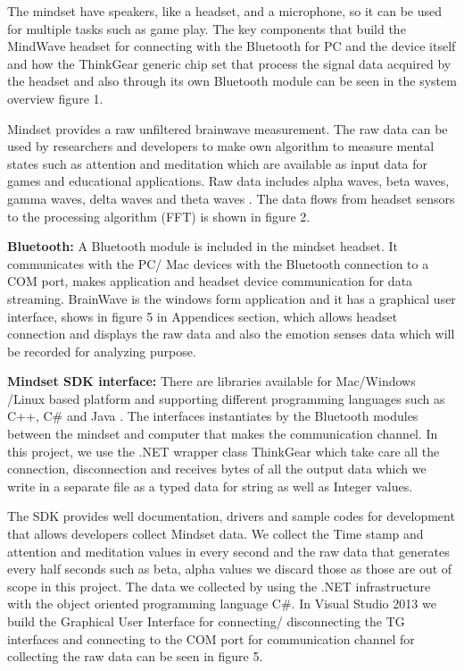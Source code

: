 \documentclass{bioinfo}
\begin{document}
The mindset have speakers, like a headset, and a microphone, so it can be used for multiple tasks such as game play. The key components that build the MindWave headset for connecting with the Bluetooth for PC and the device itself and how the ThinkGear generic chip set that process the signal data acquired by the headset and also through its own Bluetooth module can be seen in the system overview figure 1.

Mindset provides a raw unfiltered brainwave measurement. The raw data can be used by researchers and developers to make own algorithm to measure mental states such as attention and meditation which are available as input data for games and educational applications. Raw data includes alpha waves, beta waves, gamma waves, delta waves and theta waves \citep{larsen}. The data flows from headset sensors to the processing algorithm (FFT) is shown in figure 2.


\textbf{Bluetooth:} A Bluetooth module is included in the mindset headset. It communicates with the PC/ Mac devices with the Bluetooth connection to a COM port, makes application and headset device communication for data streaming. BrainWave is the windows form application and it has a graphical user interface, shows in figure 5 in Appendices section, which allows headset connection and displays the raw data and also the emotion senses data which will be recorded for analyzing purpose.


\textbf{Mindset SDK interface:} There are libraries available for Mac/Windows
/Linux based platform and supporting different programming languages such as C++, C\# and Java \citep{NeuroSky}. The interfaces instantiates by the Bluetooth modules between the mindset and computer that makes the communication channel. In this project, we use the .NET wrapper class ThinkGear which take care all the connection, disconnection and receives bytes of all the output data which we write in a separate file as a typed data for string as well as Integer values. 

The SDK provides well documentation, drivers and sample codes for development that allows developers collect Mindset data. We collect the Time stamp and attention and meditation values in every second and the raw data that generates every half seconds such as beta, alpha values we discard those as those are out of scope in this project. The data we collected by using the .NET infrastructure with the object oriented programming language C\#. In Visual Studio 2013 we build the Graphical User Interface for connecting/ disconnecting the TG interfaces and connecting to the COM port for communication channel for collecting the raw data can be seen in figure 5.
\end{document}
